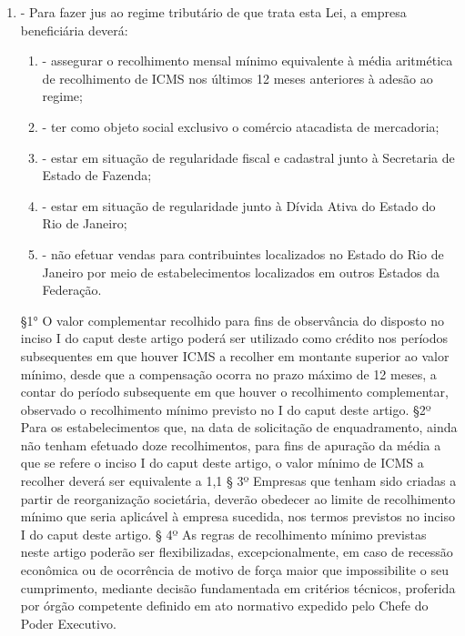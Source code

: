 \documentclass[10pt]{article}
\begin{document}
\begin{enumerate}[label=Art. \arabic*\textdegree]
\item - Para fazer jus ao regime tributário de que trata esta Lei, a empresa beneficiária deverá:
\begin{enumerate}[label=\Roman*]
\item - assegurar o recolhimento mensal mínimo equivalente à média aritmética de recolhimento de ICMS nos últimos 12 meses anteriores à adesão ao regime;
\item - ter como objeto social exclusivo o comércio atacadista de mercadoria;
\item - estar em situação de regularidade fiscal e cadastral junto à Secretaria de Estado de Fazenda; 
\item - estar em situação de regularidade junto à Dívida Ativa do Estado do Rio de Janeiro;
\item - não efetuar vendas para contribuintes localizados no Estado do Rio de Janeiro por meio de estabelecimentos localizados em outros Estados da Federação.
\end{enumerate}
§1° O valor complementar recolhido para fins de observância do disposto no inciso I do caput deste artigo poderá ser utilizado como crédito nos períodos subsequentes em que houver ICMS a recolher em montante superior ao valor mínimo, desde que a compensação ocorra no prazo máximo de 12 meses, a contar do período subsequente em que houver o recolhimento complementar, observado o recolhimento mínimo previsto no I do caput deste artigo.
§2º Para os estabelecimentos que, na data de solicitação de enquadramento, ainda não tenham efetuado doze recolhimentos, para fins de apuração da média a que se refere o inciso I do caput deste artigo, o valor mínimo de ICMS a recolher deverá ser equivalente a 1,1%
§ 3º Empresas que tenham sido criadas a partir de reorganização societária, deverão obedecer ao limite de recolhimento mínimo que seria aplicável à empresa sucedida, nos termos previstos no inciso I do caput deste artigo.
§ 4º As regras de recolhimento mínimo previstas neste artigo poderão ser flexibilizadas, excepcionalmente, em caso de recessão econômica ou de ocorrência de motivo de força maior que impossibilite o seu cumprimento, mediante decisão fundamentada em critérios técnicos, proferida por órgão competente definido em ato normativo expedido pelo Chefe do Poder Executivo.


\end{enumerate}
\end{document}
